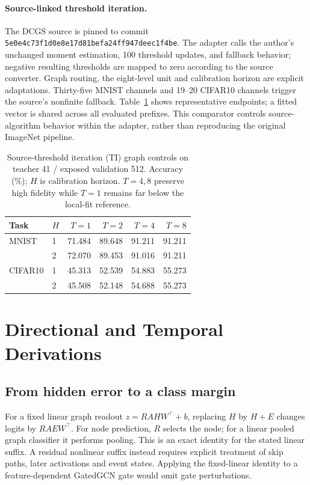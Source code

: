 \documentclass[10pt,twocolumn,letterpaper]{article}
\begin{document}
\paragraph{Source-linked threshold iteration.} The DCGS source is pinned to commit \texttt{5e0e4c73f1d0e8e17d81befa24ff947deec1f4be}. The adapter calls the author's unchanged moment estimation, 100 threshold updates, and fallback behavior; negative resulting thresholds are mapped to zero according to the source converter. Graph routing, the eight-level unit and calibration horizon are explicit adaptations. Thirty-five MNIST channels and 19--20 CIFAR10 channels trigger the source's nonfinite fallback. Table~\ref{tab:ti} shows representative endpoints; a fitted vector is shared across all evaluated prefixes. This comparator controls source-algorithm behavior within the adapter, rather than reproducing the original ImageNet pipeline.

\begin{table}[t]\centering\small
\caption{Source-threshold iteration (TI) graph controls on teacher 41 / exposed validation 512. Accuracy (\%); $H$ is calibration horizon. $T=4,8$ preserve high fidelity while $T=1$ remains far below the local-fit reference.}
\label{tab:ti}
\begin{tabular}{llrrrr}\toprule
Task & $H$ & $T=1$ & $T=2$ & $T=4$ & $T=8$\\\midrule
MNIST & 1&71.484&89.648&91.211&91.211\\
 &2&72.070&89.453&91.016&91.211\\
CIFAR10 &1&45.313&52.539&54.883&55.273\\
 &2&45.508&52.148&54.688&55.273\\\bottomrule
\end{tabular}\end{table}

\section{Directional and Temporal Derivations}
\subsection{From hidden error to a class margin}
For a fixed linear graph readout $z=RAHW^\top+b$, replacing $H$ by $H+E$ changes logits by $RAEW^\top$. For node prediction, $R$ selects the node; for a linear pooled graph classifier it performs pooling. This is an exact identity for the stated linear suffix. A residual nonlinear suffix instead requires explicit treatment of skip paths, later activations and event states. Applying the fixed-linear identity to a feature-dependent GatedGCN gate would omit gate perturbations.
\end{document}
